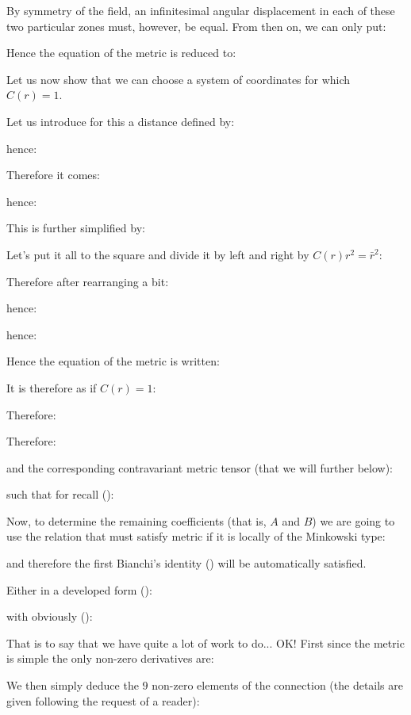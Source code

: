 	By symmetry of the field, an infinitesimal angular displacement in each of these two particular zones must, however, be equal. From then on, we can only put:
	
	Hence the equation of the metric is reduced to:
	
	Let us now show that we can choose a system of coordinates for which $C(r)=1$.

	Let us introduce for this a distance defined by:
	
	hence:
	
	Therefore it comes:
	
	hence:
	
	This is further simplified by:
	
	Let's put it all to the square and divide it by left and right by $C(r)r^2=\bar{r}^2$:
	
	Therefore after rearranging a bit:
	
	hence:
	
	hence:
	
	Hence the equation of the metric is written:
	
	It is therefore as if $C(r)=1$:
	
	Therefore:
	
	Therefore:
	
	and the corresponding contravariant metric tensor (that we will further below):
	
	such that for recall ():
	
	Now, to determine the remaining coefficients (that is, $A$ and $B$) we are going to use the relation that must satisfy metric if it is locally of the Minkowski type:
	
	and therefore the first Bianchi's identity () will be automatically satisfied.

	Either in a developed form ():
	
	with obviously ():
	
	That is to say that we have quite a lot of work to do... OK! First since the metric is simple the only non-zero derivatives are:	
	
	We then simply deduce the $9$ non-zero elements of the connection (the details are given following the request of a reader):
	
